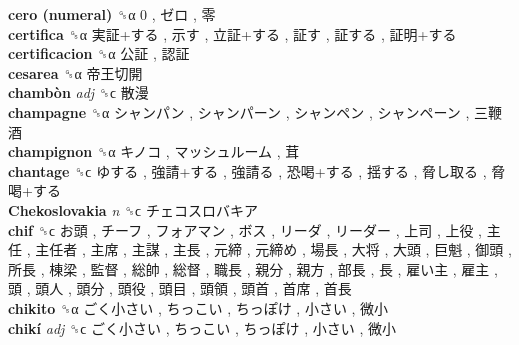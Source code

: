 \textbf{cero (numeral)} ␝α   0 ,  ゼロ ,  零   \\
\textbf{certifica} ␝α   実証+する ,  示す ,  立証+する ,  証す ,  証する ,  証明+する   \\
\textbf{certificacion} ␝α   公証 ,  認証   \\
\textbf{cesarea} ␝α   帝王切開   \\
\textbf{chambòn} \emph{adj}  ␝ϲ   散漫   \\
\textbf{champagne} ␝α   シャンパン ,  シャンパーン ,  シャンペン ,  シャンペーン ,  三鞭酒   \\
\textbf{champignon} ␝α   キノコ ,  マッシュルーム ,  茸   \\
\textbf{chantage} ␝ϲ   ゆする ,  強請+する ,  強請る ,  恐喝+する ,  揺する ,  脅し取る ,  脅喝+する   \\
\textbf{Chekoslovakia} \emph{n}  ␝ϲ   チェコスロバキア   \\
\textbf{chif} ␝ϲ   お頭 ,  チーフ ,  フォアマン ,  ボス ,  リーダ ,  リーダー ,  上司 ,  上役 ,  主任 ,  主任者 ,  主席 ,  主謀 ,  主長 ,  元締 ,  元締め ,  場長 ,  大将 ,  大頭 ,  巨魁 ,  御頭 ,  所長 ,  棟梁 ,  監督 ,  総帥 ,  総督 ,  職長 ,  親分 ,  親方 ,  部長 ,  長 ,  雇い主 ,  雇主 ,  頭 ,  頭人 ,  頭分 ,  頭役 ,  頭目 ,  頭領 ,  頭首 ,  首席 ,  首長   \\
\textbf{chikito} ␝α   ごく小さい ,  ちっこい ,  ちっぽけ ,  小さい ,  微小   \\
\textbf{chikí} \emph{adj}  ␝ϲ   ごく小さい ,  ちっこい ,  ちっぽけ ,  小さい ,  微小   \\
